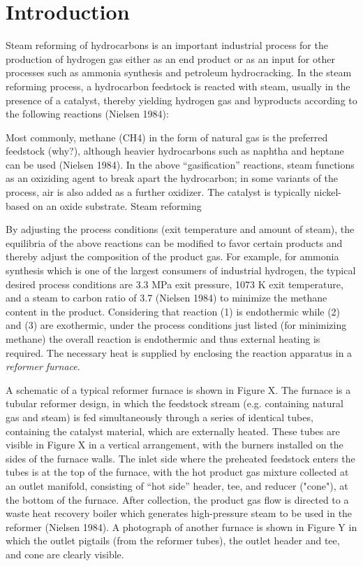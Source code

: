 \chapter{Introduction} \label{ch:introduction}

Steam reforming of hydrocarbons is an important industrial process for the production of hydrogen gas either as an end product or as an input for other processes such as ammonia synthesis and petroleum hydrocracking. In the steam reforming process, a hydrocarbon feedstock is reacted with steam, usually in the presence of a catalyst, thereby yielding hydrogen gas and byproducts according to the following reactions (Nielsen 1984):


Most commonly, methane (CH4) in the form of natural gas is the preferred feedstock (why?), although heavier hydrocarbons such as naphtha and heptane can be used (Nielsen 1984). In the above ``gasification'' reactions, steam functions as an oxiziding agent to break apart the hydrocarbon; in some variants of the process, air is also added as a further oxidizer. The catalyst is typically nickel-based on an oxide substrate. Steam reforming 

By adjusting the process conditions (exit temperature and amount of steam), the equilibria of the above reactions can be modified to favor certain products and thereby adjust the composition of the product gas. For example, for ammonia synthesis which is one of the largest consumers of industrial hydrogen, the typical desired process conditions are 3.3 MPa exit pressure, 1073 K exit temperature, and a steam to carbon ratio of 3.7 (Nielsen 1984) to minimize the methane content in the product. Considering that reaction (1) is endothermic while (2) and (3) are exothermic, under the process conditions just listed (for minimizing methane) the overall reaction is endothermic and thus external heating is required. The necessary heat is supplied by enclosing the reaction apparatus in a \emph{reformer furnace}.

A schematic of a typical reformer furnace is shown in Figure X. The furnace is a tubular reformer design, in which the feedstock stream (e.g. containing natural gas and steam) is fed simultaneously through a series of identical tubes, containing the catalyst material, which are externally heated. These tubes are visible in Figure X in a vertical arrangement, with the burners installed on the sides of the furnace walls. The inlet side where the preheated feedstock enters the tubes is at the top of the furnace, with the hot product gas mixture collected at an outlet manifold, consisting of ``hot side'' header, tee, and reducer ("cone"), at the bottom of the furnace. After collection, the product gas flow is directed to a waste heat recovery boiler which generates high-pressure steam to be used in the reformer (Nielsen 1984). A photograph of another furnace is shown in Figure Y in which the outlet pigtails (from the reformer tubes), the outlet header and tee, and cone are clearly visible.

